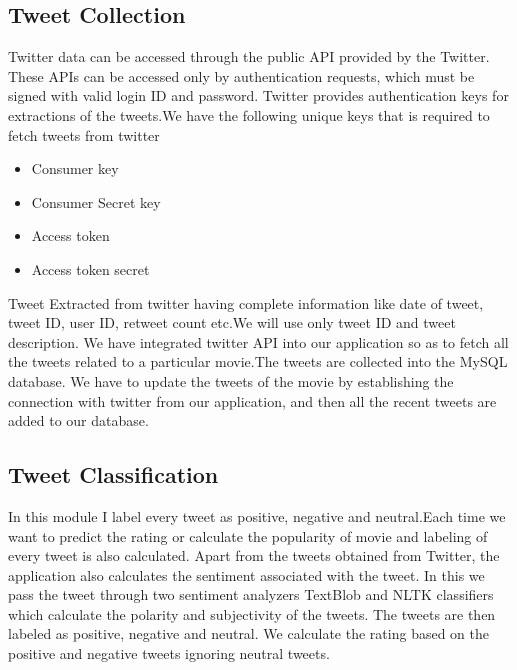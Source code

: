 \documentclass[a4paper]{article}
\begin{document}
\subsection{Tweet Collection}
Twitter data can be accessed through the public API provided
by the Twitter. These APIs can be accessed only by
authentication requests, which must be signed with valid login
ID and password. Twitter provides authentication keys for
extractions of the tweets.We have the following unique keys that is
required to fetch tweets from twitter
\begin{itemize}
\item Consumer key
\item Consumer Secret key
\item Access token
\item Access token secret
\end{itemize}
Tweet Extracted from twitter having complete information
like date of tweet, tweet ID, user ID, retweet count etc.We
will use only tweet ID and tweet description. We have integrated
twitter API into our application so as to fetch all the tweets
related to a particular movie.The tweets are
collected into the MySQL database. We have to update the tweets of the movie by
establishing the connection with twitter from our application,
and then all the recent tweets are added to our database.

\subsection{Tweet Classification}
In this module I label every tweet as positive, negative and
neutral.Each time we want to predict the rating
or calculate the popularity of movie and labeling of every
tweet is also calculated. Apart from the tweets obtained from 
Twitter, the application also calculates the sentiment
associated with the tweet. In this we pass the tweet through two sentiment analyzers TextBlob and NLTK classifiers which calculate the polarity and subjectivity of the tweets. The tweets are then labeled as positive, negative and neutral. We calculate the rating based on the positive  and negative tweets ignoring neutral tweets.  
\end{document}
